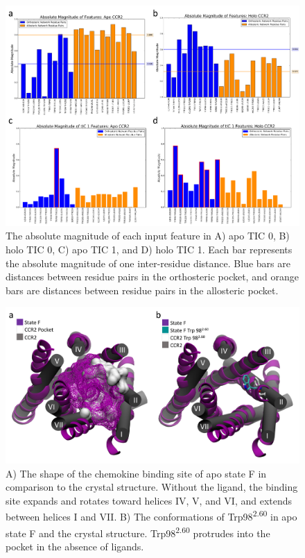 \begin{figure}[htbp]
  \begin{center}
  \includegraphics[width=\textwidth]{./figures/tic0_tic1_contributions.png}
\caption{The absolute magnitude of each input feature in A) apo TIC 0, B) holo TIC 0, C) apo TIC 1, and D) holo TIC 1. Each bar represents the absolute magnitude of one inter-residue distance. Blue bars are distances between residue pairs in the orthosteric pocket, and orange bars are distances between residue pairs in the allosteric pocket.}
\label{fig:tic0_contributions}
  \end{center}
\end{figure}

\begin{figure}[htbp]
\centering
\includegraphics[width=\textwidth]{./figures/apoF_ccr2_orthopocketSI.png}
\caption{A) The shape of the chemokine binding site of apo state F in comparison to the crystal structure. Without the ligand, the binding site expands and rotates toward helices IV,  V,  and VI, and extends between helices I and VII. B) The conformations of Trp98\textsuperscript{2.60} in apo state F and the crystal structure. Trp98\textsuperscript{2.60} protrudes into the pocket in the absence of ligands.}
\label{fig:apoF_ccr2_orthopocketSI}
\end{figure}

